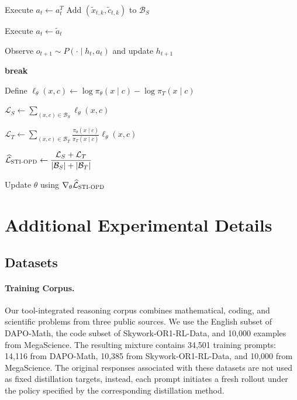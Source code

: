 \begin{algorithm}[ht]
\begin{algorithmic}[1]
                        \State Execute $a_t\gets a_t^T$
                    \Else
                            \State Add
                            $(\widetilde x_{t,k},\widetilde c_{t,k})$
                            to $\mathcal{B}_S$
                        \EndFor

                        \State Execute $a_t\gets\widetilde a_t$
                    \EndIf

                    \State Observe
                    $o_{t+1}\sim P(\cdot\mid h_t,a_t)$
                    and update $h_{t+1}$

                        \State \textbf{break}
                    \EndIf
                \EndFor
            \EndFor

            \State Define
            $\ell_\theta(x,c)\gets
            \log\pi_\theta(x\mid c)-\log\pi_T(x\mid c)$

            \State $\mathcal{L}_S\gets
            \displaystyle
            \sum_{(x,c)\in\mathcal{B}_S}
            \ell_\theta(x,c)$

            \State $\mathcal{L}_T\gets
            \displaystyle
            \sum_{(x,c)\in\mathcal{B}_T}
            \frac{\pi_\theta(x\mid c)}
                 {\pi_T(x\mid c)}
            \ell_\theta(x,c)$

            \State $\widehat{\mathcal{L}}_{\textsc{{STI-OPD}}}\gets
            \dfrac{\mathcal{L}_S+\mathcal{L}_T}
            {|\mathcal{B}_S|+|\mathcal{B}_T|}$

            \State Update $\theta$ using
            $\nabla_\theta\widehat{\mathcal{L}}_{\textsc{{STI-OPD}}}$
        \EndWhile
    \end{algorithmic}
\end{algorithm}

\section{Additional Experimental Details}
\label{app:experimental_details}

\subsection{Datasets}
\label{app:datasets}

\paragraph{Training Corpus.}
Our tool-integrated reasoning corpus combines mathematical, coding, and scientific problems from three public sources.  
We use the English subset of DAPO-Math, the code subset of Skywork-OR1-RL-Data, and 10,000 examples from MegaScience. 
The resulting mixture contains 34,501 training prompts: 14,116 from DAPO-Math, 10,385 from Skywork-OR1-RL-Data, and 10,000 from MegaScience.  
The original responses associated with these datasets are not used as fixed distillation targets, instead, each prompt initiates a fresh rollout under the policy specified by the corresponding distillation method.

